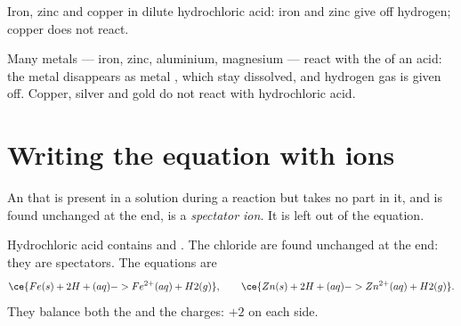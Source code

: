 \begin{omfigure}

{\small Iron, zinc and copper in dilute hydrochloric acid: iron and zinc
give off hydrogen; copper does not react.}
\end{omfigure}

\begin{proposition}\label{prop:g9:metals-acids-corrosion:acid}
Many metals --- iron, zinc, aluminium, magnesium --- react with the
  of an acid: the metal disappears as metal , which stay
dissolved, and hydrogen gas is given off. Copper, silver and gold do not
react with hydrochloric acid.
\end{proposition}

\section{Writing the equation with ions}

\begin{definition}\label{def:g9:metals-acids-corrosion:spectator}
An  that is present in a solution during a reaction but takes no part
in it, and is found unchanged at the end, is a \emph{spectator
ion}. It is left out of the equation.
\end{definition}

\begin{example}\label{ex:g9:metals-acids-corrosion:iron}
Hydrochloric acid contains  and  . The
chloride  are found unchanged at the end: they are spectators. The
equations are
\[
  \ce{Fe(s) + 2H+(aq) -> Fe^{2+}(aq) + H2(g)}, \qquad
  \ce{Zn(s) + 2H+(aq) -> Zn^{2+}(aq) + H2(g)}.
\]
They balance both the  and the charges: $+2$ on each side.
\end{example}

